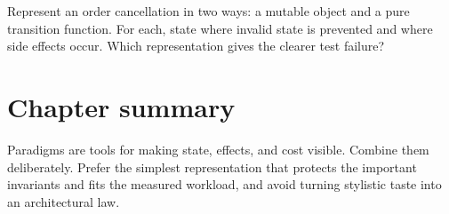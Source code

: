 \begin{exercise}
Represent an order cancellation in two ways: a mutable object and a pure
transition function. For each, state where invalid state is prevented and where
side effects occur. Which representation gives the clearer test failure?
\end{exercise}

\section{Chapter summary}
Paradigms are tools for making state, effects, and cost visible. Combine them
deliberately. Prefer the simplest representation that protects the important
invariants and fits the measured workload, and avoid turning stylistic taste into
an architectural law.
